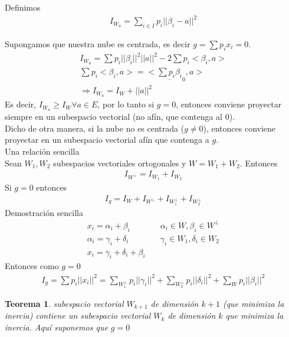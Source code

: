 \documentclass[10pt]{article}
\theoremstyle{plain}
\newtheorem{teo}{Teorema}
\theoremstyle{definition}
\begin{document}
Definimos
\begin{align*}
I_{W_{a}} = \sum_{i \in I} p_{i}||\beta_{i}-a||^2
\end{align*}

Supongamos que nuestra nube es centrada, es decir $g = \sum p_{i}x_{i} = 0$.
\begin{align*}
I_{W_{a}} = \sum p_{i}||\beta_{i}||^2||a||^2 - 2 \sum p_{i} <\beta_{i},a>\\
\sum p_{i}<\beta_{i},a> = <\underline{\sum p_{i}\beta_{i}}_{0}, a>\\
\Rightarrow I_{W_{a}} = I_{W} + ||a||^2
\end{align*}
Es decir, $I_{W_{a}} \ge I_{W} \forall a \in E$, por lo tanto si $g=0$, entonces conviene proyectar siempre en un subespacio vectorial (no afín, que contenga al 0).\\

Dicho de otra manera, si la nube no es centrada ($g\not = 0$), entonces conviene proyectar en un subespacio vectorial afín que contenga a $g$.\\

Una relación sencilla\\

Sean $W_{1}, W_{2}$ subespacios vectoriales ortogonales y $W = W_{1} + W_{2}$. Entonces
\begin{align*}
I_{W^{\perp}} = I_{W_{1}} + I_{W_{2}}
\end{align*}
Si $g=0$ entonces
\begin{align*}
I_{g} = I_{W} + I_{W^{\perp}} + I_{W_{1}^{\perp}} + I_{W_{2}^{\perp}}
\end{align*}
Demostración sencilla 
\begin{align*}
x_{i} = \alpha_{i} + \beta_{i} & \quad \alpha_{i} \in W, \beta_{i} \in W^{\perp}\\
\alpha_{i} = \gamma_{i} + \delta_{i} & \quad \gamma_{i} \in W_{1}, \delta_{i} \in W_{2}\\
x_{i} = \gamma_{i} + \delta_{i} + \beta_{i}
\end{align*}
Entonces como $g=0$
\begin{align*}
I_{g} =\sum p_{i} ||x_{i}||^2 = \sum_{W_{1}^{\perp}}  p_{i} ||\gamma_{i}||^2 + \sum_{W_{2}^{\perp}}  p_{i} ||\delta_{i}||^2 + \sum_{W}  p_{i} ||\beta_{i}||^2
\end{align*}

\begin{teo} subespacio vectorial $W_{k+1}$ de dimensión $k+1$ (que minimiza la inercia) contiene un subespacio vectorial $W_{k}$ de dimensión $k$ que minimiza la inercia. Aquí suponemos que $g=0$
\end{teo}
\end{document}
